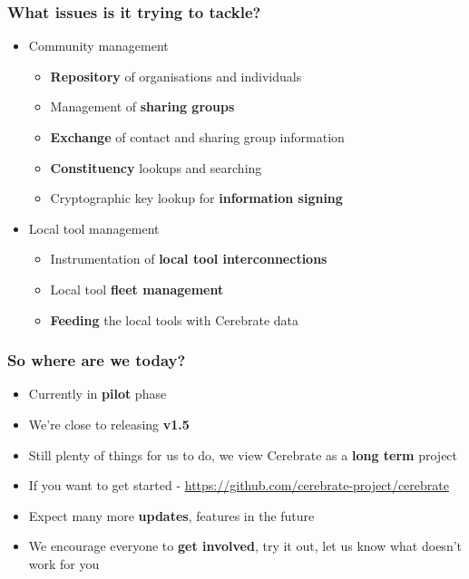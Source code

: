 \begin{frame}
	\frametitle{What issues is it trying to tackle?}
	\begin{itemize}
                \item Community management
		\begin{itemize}
                    \item {\bf Repository} of organisations and individuals
                    \item Management of {\bf sharing groups}
                    \item {\bf Exchange} of contact and sharing group information
                    \item {\bf Constituency} lookups and searching 
                    \item Cryptographic key lookup for {\bf information signing}
		\end{itemize}
                \item Local tool management
		\begin{itemize}
                    \item Instrumentation of {\bf local tool interconnections}
                    \item Local tool {\bf fleet management}
                    \item {\bf Feeding} the local tools with Cerebrate data
                \end{itemize}
	\end{itemize}
\end{frame}

\begin{frame}
	\frametitle{So where are we today?}
	\begin{itemize}
                \item Currently in {\bf pilot} phase
                \item We're close to releasing {\bf v1.5}
                \item Still plenty of things for us to do, we view Cerebrate as a {\bf long term} project
                \item If you want to get started - \url{https://github.com/cerebrate-project/cerebrate}
                \item Expect many more {\bf updates}, features in the future
                \item We encourage everyone to {\bf get involved}, try it out, let us know what doesn't work for you
	\end{itemize}
\end{frame}

